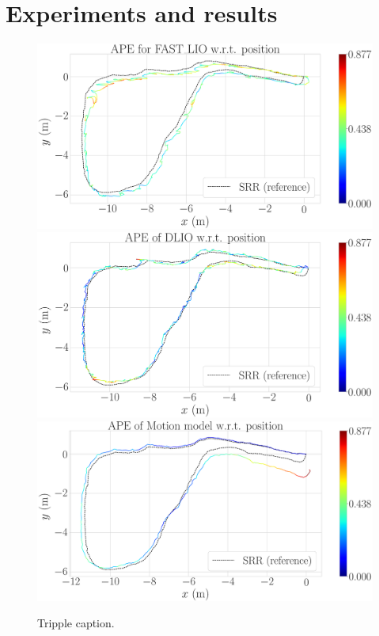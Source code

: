 \section{Experiments and results}

\begin{figure}
  \centering 
  \includegraphics[width=\linewidth]{img/ape_fast_lio} \vskip 2mm
  \includegraphics[width=\linewidth]{img/ape_dlio} \vskip 2mm
  \includegraphics[width=\linewidth]{img/ape_model}
  \caption{Tripple caption.}
  \label{fig:ape}
\end{figure}

